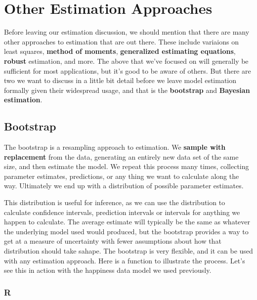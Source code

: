 \documentclass[
  letterpaper,
]{krantz}
\begin{document}
\section{Other Estimation Approaches}\label{other-estimation-approaches}

Before leaving our estimation discussion, we should mention that there
are many other approaches to estimation that are out there. These
include variaions on least squares, \textbf{method of moments},
\textbf{generalized estimating equations}, \textbf{robust} estimation,
and more. The above that we've focused on will generally be sufficient
for most applications, but it's good to be aware of others. But there
are two we want to discuss in a little bit detail before we leave model
estimation formally given their widespread usage, and that is the
\textbf{bootstrap} and \textbf{Bayesian estimation}.

\subsection{Bootstrap}\label{bootstrap}

The bootstrap is a resampling approach to estimation. We \textbf{sample
with replacement} from the data, generating an entirely new data set of
the same size, and then estimate the model. We repeat this process many
times, collecting parameter estimates, predictions, or any thing we want
to calculate along the way. Ultimately we end up with a distribution of
possible parameter estimates.

This distribution is useful for inference, as we can use the
distribution to calculate confidence intervals, prediction intervals or
intervals for anything we happen to calculate. The average estimate will
typically be the same as whatever the underlying model used would
produced, but the bootstrap provides a way to get at a measure of
uncertainty with fewer assumptions about how that distribution should
take sahape. The bootstrap is very flexible, and it can be used with any
estimation approach. Here is a function to illustrate the process. Let's
see this in action with the happiness data model we used previously.

\subsubsection{R}
\end{document}
